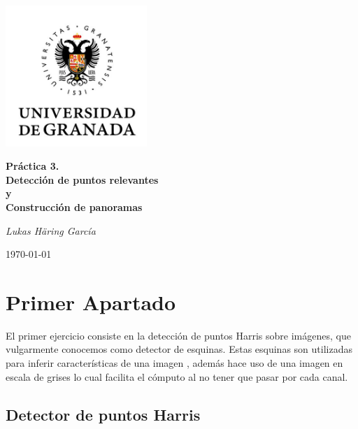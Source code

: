 \documentclass{article}
\begin{document}
\begin{titlepage}
	\centering
	{\includegraphics[width=0.4\textwidth]{../assets/logo.jpg} \par}
	\vspace{3cm}
	{\huge\bfseries Práctica 3.\\ Detección de puntos relevantes\\ y\\ Construcción de panoramas\par}
	\vspace{2cm}
	{\Large\itshape Lukas Häring García\par}
	\vfill
	\vfill

	{\large \today\par}
\end{titlepage}

\tableofcontents
\newpage

\section{Primer Apartado}

El primer ejercicio consiste en la detección de puntos Harris sobre imágenes, que vulgarmente conocemos como detector de esquinas. Estas esquinas son utilizadas para inferir características de una imagen , además hace uso de una imagen en escala de grises lo cual facilita el cómputo al no tener que pasar por cada canal.

\subsection{Detector de puntos Harris}
\end{document}
